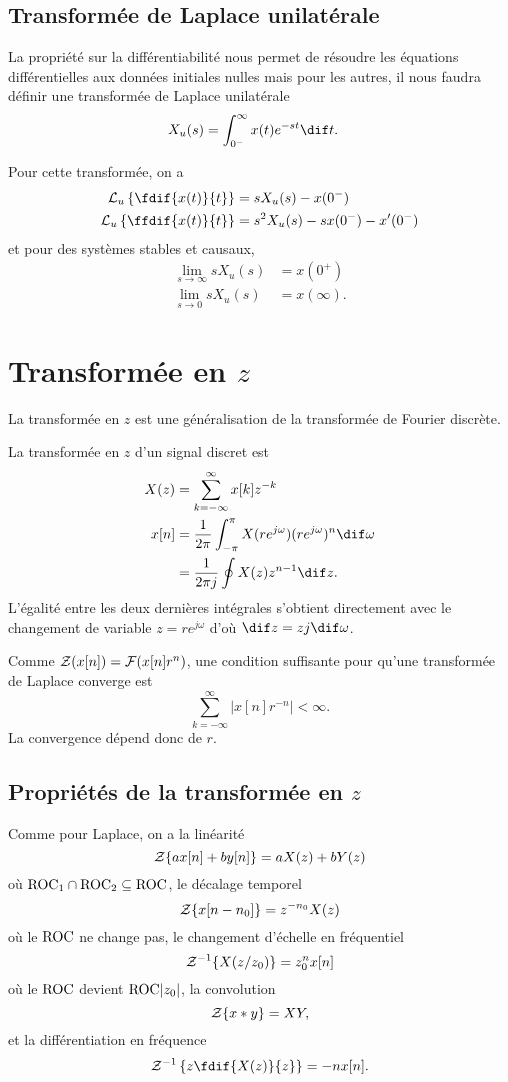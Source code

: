 \subsection{Transformée de Laplace unilatérale}
\label{sec:laplacu}
La propriété sur la différentiabilité nous permet de résoudre les équations
différentielles aux données initiales nulles mais pour les autres,
il nous faudra définir une transformée de Laplace unilatérale
\begin{align*}
  X_u(s) & = \int_{0^-}^\infty x(t) e^{-st} \dif t.
\end{align*}

Pour cette transformée, on a
\begin{align*}
  \laplacu\left\{\fdif{x(t)}{t}\right\} & =
  sX_u(s) - x(0^-)\\
  \laplacu\left\{\ffdif{x(t)}{t}\right\} & =
  s^2X_u(s) - sx(0^-) - x'(0^-)
\end{align*}
et pour des systèmes stables et causaux,
\begin{align*}
  \lim_{s\to\infty} sX_u(s) & = x(0^+)\\
  \lim_{s\to 0} sX_u(s) & = x(\infty).
\end{align*}

\section{Transformée en $z$}
La transformée en $z$ est une généralisation de la transformée de Fourier
discrète.

La transformée en $z$ d'un signal discret est
\begin{align*}
  X(z) & = \sum_{k=-\infty}^{\infty} x[k]z^{-k}\\
  x[n] & =
  \frac{1}{2\pi}\int_{-\pi}^{\pi} X(re^{j\omega})(re^{j\omega})^n\dif \omega\\
  & = \frac{1}{2\pi j}\oint X(z) z^{n-1} \dif z.
\end{align*}
L'égalité entre les deux dernières intégrales
s'obtient directement avec le changement
de variable $z = re^{j\omega}$ d'où $\dif z = zj\dif \omega$.

Comme $\mathcal{Z}(x[n]) = \mathcal{F}(x[n]r^n)$,
une condition suffisante pour qu'une transformée de Laplace converge est
\[ \sum_{k=-\infty}^\infty|x[n]r^{-n}| < \infty. \]
La convergence dépend donc de $r$.

\subsection{Propriétés de la transformée en $z$}
Comme pour Laplace, on a la linéarité
\[ \mathcal{Z}\{ax[n]+by[n]\} = aX(z) + bY(z) \]
où $\mathrm{ROC}_1 \cap \mathrm{ROC}_2 \subseteq \mathrm{ROC}$,
le décalage temporel
\[ \mathcal{Z}\{x[n-n_0]\} = z^{-n_0}X(z) \]
où le $\mathrm{ROC}$ ne change pas,
le changement d'échelle en fréquentiel
\[ \mathcal{Z}^{-1}\{X(z/z_0)\} = z_0^nx[n] \]
où le $\mathrm{ROC}$ devient $\mathrm{ROC} |z_0|$,
la convolution
\[ \mathcal{Z}\{x*y\} = XY, \]
et la différentiation en fréquence
\[ \transfz^{-1}\left\{z\fdif{X(z)}{z}\right\} = -nx[n]. \]

